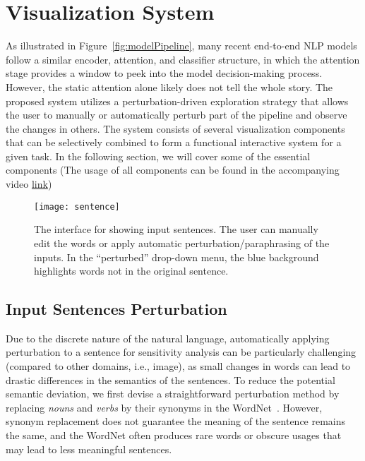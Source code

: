 
\section{Visualization System}
As illustrated in Figure~\ref{fig:modelPipeline}, many recent end-to-end NLP models follow a similar encoder, attention, and classifier structure, in which the attention stage provides a window to peek into the model decision-making process. 
However, the static attention alone likely does not tell the whole story. 
The proposed system utilizes a perturbation-driven exploration strategy that allows the user to manually or automatically perturb part of the pipeline and observe the changes in others.
%
The system consists of several visualization components that can be selectively combined to form a functional interactive system for a given task. In the following section, we will cover some of the essential components (The usage of all components can be found in the accompanying video \href{https://www.youtube.com/watch?v=dcpTyWfBhp0}{link})

\begin{figure}[htbp]
\centering
\vspace{-2mm}
 \texttt{[image: sentence]}
 \vspace{-2mm}
 \caption{
The interface for showing input sentences. The user can manually edit the words or apply automatic perturbation/paraphrasing of the inputs. In the ``perturbed'' drop-down menu, the blue background highlights words not in the original sentence.
 }
 \vspace{-1mm}
\label{fig:sentence}
\end{figure}

\subsection{Input Sentences Perturbation}
\label{sec:perturb}
Due to the discrete nature of the natural language, automatically applying perturbation to a sentence for sensitivity analysis can be particularly challenging (compared to other domains, i.e., image), as small changes in words can lead to drastic differences in the semantics of the sentences.
To reduce the potential semantic deviation, we first devise a straightforward perturbation method by replacing \emph{nouns} and \emph{verbs} by their synonyms in the WordNet~\cite{Miller1995}. However, synonym replacement does not guarantee the meaning of the sentence remains the same, and the WordNet often produces rare words or obscure usages that may lead to less meaningful sentences.

